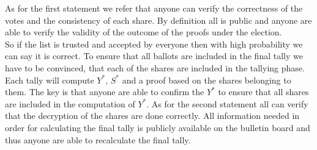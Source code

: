\noindent
As for the first statement we refer that anyone can verify the correctness of the votes and the consistency of each share. By definition all is public and anyone are able to verify the validity of the outcome of the proofs under the election.\\

\noindent
So if the list is trusted and accepted by everyone then with high probability we can say it is correct. To ensure that all ballots are included in the final tally we have to be convinced, that each of the shares are included in the tallying phase. Each tally will compute $Y^*$, $S^*$ and a proof based on the shares belonging to them. The key is that anyone are able to confirm the $Y^*$ to ensure that all shares are included in the computation of $Y^*$. As for the second statement all can verify that the decryption of the shares are done correctly. All information needed in order for calculating the final tally is publicly available on the bulletin board and thus anyone are able to recalculate the final tally.      

